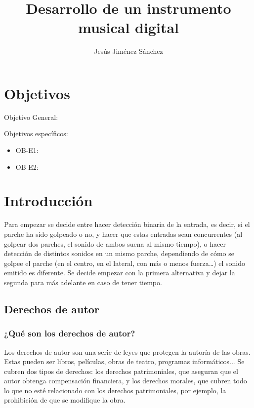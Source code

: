\documentclass{article}
\title{Desarrollo de un instrumento musical digital}
\author{ Jesús Jiménez Sánchez }
\begin{document}
\maketitle

\section*{Objetivos}\label{sec:Objetivos}
Objetivo General:

Objetivos específicos:
\begin{itemize}
    \item OB-E1: 
    \item OB-E2:
\end{itemize}

\section{Introducción}\label{sec:Introduccion}
Para empezar se decide entre hacer detección binaria de la entrada, es decir, si el parche ha sido golpeado o no, y
hacer que estas entradas sean concurrentes (al golpear dos parches, el sonido de ambos suena al mismo tiempo), o
hacer detección de distintos sonidos en un mismo parche, dependiendo de cómo se golpee el parche (en el centro, en
el lateral, con más o menos fuerza…) el sonido emitido es diferente.\newline
Se decide empezar con la primera alternativa y dejar la segunda para más adelante en caso de tener tiempo.

\subsection{Derechos de autor}
\subsubsection{¿Qué son los derechos de autor?}
Los derechos de autor son una serie de leyes que protegen la autoría de las obras. Estas pueden ser libros,
películas, obras de teatro, programas informáticos...\newline
Se cubren dos tipos de derechos: los derechos patrimoniales, que aseguran que el autor obtenga compensación
financiera, y los derechos morales, que cubren todo lo que no esté relacionado con los derechos patrimoniales, por
ejemplo, la prohibición de que se modifique la obra.\cite{derechos_ompi}
\end{document}

